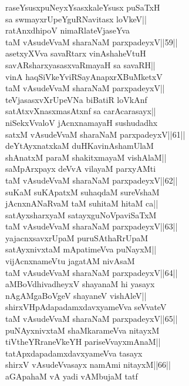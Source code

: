\documentclass{article}
\begin{document}
raseYsusxpuNeyxYsasxkaleYsusx puSaTxH\\
sa swmayxrUpeYguRNavitasx loVkeV||\\
ratAnxdhipoV nimaRlateVjaseYva\\
taM vAsudeVvaM sharaNaM parxpadeyxV||59||\\
asetxyXVva savaRtarx vinAshaheVtuH\\
savARsharxyasasxvaRmayaH sa savaRH||\\
vinA haqSiVkeYviRSayAnapxrXBuMketxV\\
taM vAsudeVvaM sharaNaM parxpadeyxV||\\
teVjasasxvXrUpeVNa biBatiR loVkAnf\\
satAtxvXnasxmasAtxnf sa carAcarasayx||\\
niSekxVvaloV jAcnxnamayaH sushudadhx\\
satxM vAsudeVvaM sharaNaM parxpadeyxV||61||\\
deYtAyxnatxkaM duHKavinAshamUlaM\\
shAnatxM paraM shakitxmayaM vishAlaM||\\
saMpArxpayx deVvA vilayaM parxyAMti\\
taM vAsudeVvaM sharaNaM parxpadeyxV||62||\\
suKaM suKApatxM suhaqdaM sureVshaM\\
jAcnxnANaRvaM taM suhitaM hitaM ca||\\
satAyxsharxyaM satayxguNoVpaviSaTxM\\
taM vAsudeVvaM sharaNaM parxpadeyxV||63||\\
yajacnxsavxrUpaM puruSAthaRrUpaM\\
satAyxnivxtaM mApatimeVva puNayxM||\\
vijAcnxnameVtu jagatAM nivAsaM\\
taM vAsudeVvaM sharaNaM parxpadeyxV||64||\\
aMBoVdhivadheyxV shayanaM hi yasayx\\
nAgAMgaBoVgeV shayaneV vishAleV||\\
shirxVHpAdapadamxdavxyameVva seVvateV\\
taM vAsudeVvaM sharaNaM parxpadeyxV||65||\\
puNAyxnivxtaM shaMkarameVva nitayxM\\
tiVtheYRraneVkeYH pariseVvayxmAnaM||\\
tatApxdapadamxdavxyameVva tasayx\\
shirxV vAsudeVvasayx namAmi nitayxM||66||\\
aGApahaM vA yadi vAMbujaM tatf\\
\end{document}
